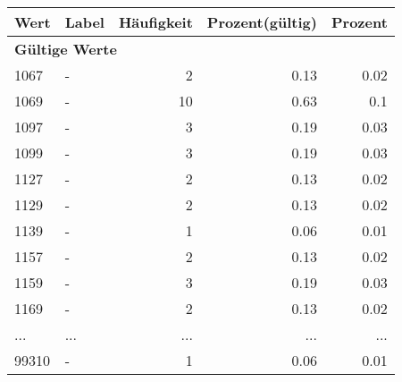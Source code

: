      \begin{longtable}{lXrrr}
     \toprule
     \textbf{Wert} & \textbf{Label} & \textbf{Häufigkeit} & \textbf{Prozent(gültig)} & \textbf{Prozent} \\
     \endhead
     \midrule
     \multicolumn{5}{l}{\textbf{Gültige Werte}}\\
        1067 & \multicolumn{1}{X}{-} & %
          \num{2} &
          \num[round-mode=places,round-precision=2]{0.13} &
          \num[round-mode=places,round-precision=2]{0.02} \\
        1069 & \multicolumn{1}{X}{-} & %
          \num{10} &
          \num[round-mode=places,round-precision=2]{0.63} &
          \num[round-mode=places,round-precision=2]{0.1} \\
        1097 & \multicolumn{1}{X}{-} & %
          \num{3} &
          \num[round-mode=places,round-precision=2]{0.19} &
          \num[round-mode=places,round-precision=2]{0.03} \\
        1099 & \multicolumn{1}{X}{-} & %
          \num{3} &
          \num[round-mode=places,round-precision=2]{0.19} &
          \num[round-mode=places,round-precision=2]{0.03} \\
        1127 & \multicolumn{1}{X}{-} & %
          \num{2} &
          \num[round-mode=places,round-precision=2]{0.13} &
          \num[round-mode=places,round-precision=2]{0.02} \\
        1129 & \multicolumn{1}{X}{-} & %
          \num{2} &
          \num[round-mode=places,round-precision=2]{0.13} &
          \num[round-mode=places,round-precision=2]{0.02} \\
        1139 & \multicolumn{1}{X}{-} & %
          \num{1} &
          \num[round-mode=places,round-precision=2]{0.06} &
          \num[round-mode=places,round-precision=2]{0.01} \\
        1157 & \multicolumn{1}{X}{-} & %
          \num{2} &
          \num[round-mode=places,round-precision=2]{0.13} &
          \num[round-mode=places,round-precision=2]{0.02} \\
        1159 & \multicolumn{1}{X}{-} & %
          \num{3} &
          \num[round-mode=places,round-precision=2]{0.19} &
          \num[round-mode=places,round-precision=2]{0.03} \\
        1169 & \multicolumn{1}{X}{-} & %
          \num{2} &
          \num[round-mode=places,round-precision=2]{0.13} &
          \num[round-mode=places,round-precision=2]{0.02} \\
       ... & ... & ... & ... & ... \\
        99310 & \multicolumn{1}{X}{-} & %
          \num{1} &
          \num[round-mode=places,round-precision=2]{0.06} &
          \num[round-mode=places,round-precision=2]{0.01} \\


\end{longtable}

